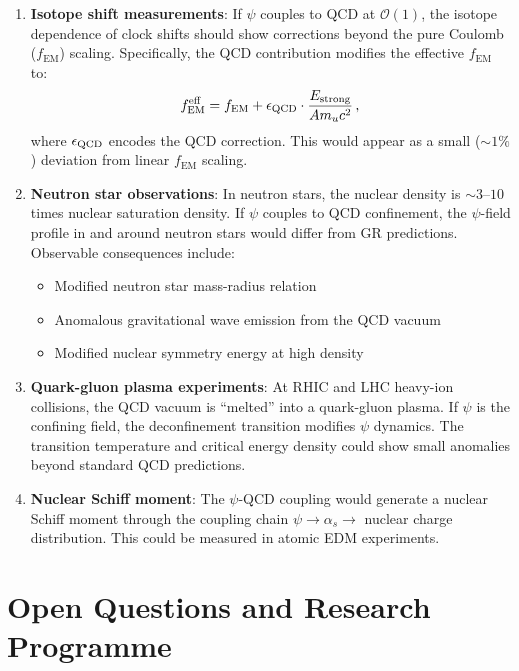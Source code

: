\documentclass[aps,prd,twocolumn,superscriptaddress,floatfix,nofootinbib]{revtex4-2}
\renewcommand{\order}[1]{\mathcal{O}\!\left(#1\right)}
\newcommand{\as}{\alpha_s}
\newcommand{\fEM}{f_{\mathrm{EM}}}
\begin{document}
\begin{enumerate}
\item \textbf{Isotope shift measurements}: If $\psi$ couples to QCD at $\order{1}$,
the isotope dependence of clock shifts should show corrections beyond the pure
Coulomb ($\fEM$) scaling. Specifically, the QCD contribution modifies the
effective $\fEM$ to:
\begin{equation}
\fEM^{\rm eff} = \fEM + \epsilon_{\rm QCD} \cdot \frac{E_{\rm strong}}{A m_u c^2}
\, ,
\end{equation}
where $\epsilon_{\rm QCD}$ encodes the QCD correction. This would appear as a
small ($\sim 1\%$) deviation from linear $\fEM$ scaling.

\item \textbf{Neutron star observations}: In neutron stars, the nuclear density is
$\sim 3$--$10$ times nuclear saturation density. If $\psi$ couples to QCD
confinement, the $\psi$-field profile in and around neutron stars would differ
from GR predictions. Observable consequences include:
\begin{itemize}
\item Modified neutron star mass-radius relation
\item Anomalous gravitational wave emission from the QCD vacuum
\item Modified nuclear symmetry energy at high density
\end{itemize}

\item \textbf{Quark-gluon plasma experiments}: At RHIC and LHC heavy-ion
collisions, the QCD vacuum is ``melted'' into a quark-gluon plasma. If $\psi$
is the confining field, the deconfinement transition modifies $\psi$ dynamics.
The transition temperature and critical energy density could show small
anomalies beyond standard QCD predictions.

\item \textbf{Nuclear Schiff moment}: The $\psi$-QCD coupling would generate
a nuclear Schiff moment through the coupling chain $\psi \to \as \to$ nuclear
charge distribution. This could be measured in atomic EDM experiments.
\end{enumerate}


\section{Open Questions and Research Programme}
\label{sec:open}
\end{document}
